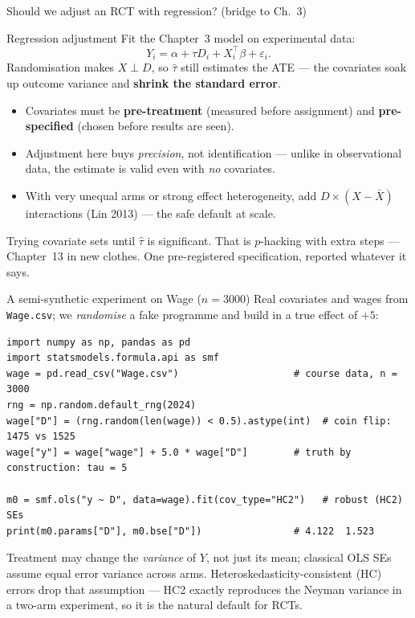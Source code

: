 \documentclass[aspectratio=169,11pt]{beamer}
\begin{document}
\begin{frame}{Should we adjust an RCT with regression? (bridge to Ch.\ 3)}
  \begin{block}{Regression adjustment}
    Fit the Chapter~3 model on experimental data:
    \[
      Y_i = \alpha + \tau D_i + X_i^\top\beta + \varepsilon_i .
    \]
    Randomisation makes $X \perp D$, so $\hat\tau$ still estimates the ATE --- the
    covariates soak up outcome variance and \textbf{shrink the standard error}.
  \end{block}
  \begin{readme}
    \begin{itemize}
      \item Covariates must be \textbf{pre-treatment} (measured before assignment) and
            \textbf{pre-specified} (chosen before results are seen).
      \item Adjustment here buys \emph{precision}, not identification --- unlike in
            observational data, the estimate is valid even with \emph{no} covariates.
      \item With very unequal arms or strong effect heterogeneity, add
            $D\times(X-\bar X)$ interactions (Lin 2013) --- the safe default at scale.
    \end{itemize}
  \end{readme}
  \begin{mistake}
    Trying covariate sets until $\hat\tau$ is significant. That is $p$-hacking with extra
    steps --- Chapter~13 in new clothes. One pre-registered specification, reported
    whatever it says.
  \end{mistake}
\end{frame}

\begin{frame}[fragile]{A semi-synthetic experiment on Wage ($n=3000$)}
  Real covariates and wages from \texttt{Wage.csv}; we \emph{randomise} a fake programme
  and build in a true effect of $+5$:
  \begin{lstlisting}
import numpy as np, pandas as pd
import statsmodels.formula.api as smf
wage = pd.read_csv("Wage.csv")                    # course data, n = 3000
rng = np.random.default_rng(2024)
wage["D"] = (rng.random(len(wage)) < 0.5).astype(int)  # coin flip: 1475 vs 1525
wage["y"] = wage["wage"] + 5.0 * wage["D"]        # truth by construction: tau = 5

m0 = smf.ols("y ~ D", data=wage).fit(cov_type="HC2")   # robust (HC2) SEs
print(m0.params["D"], m0.bse["D"])                # 4.122  1.523
  \end{lstlisting}
  \begin{readme}[Why \texttt{cov\_type="HC2"}]
    Treatment may change the \emph{variance} of $Y$, not just its mean; classical OLS
    SEs assume equal error variance across arms. Heteroskedasticity-consistent (HC)
    errors drop that assumption --- HC2 exactly reproduces the Neyman variance in a
    two-arm experiment, so it is the natural default for RCTs.
  \end{readme}
\end{frame}
\end{document}
